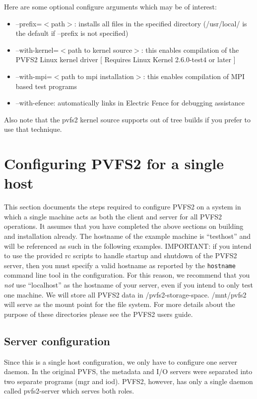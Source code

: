 \documentclass[11pt, letterpaper]{article}
\begin{document}
Here are some optional configure arguments which may be of interest:
\begin{itemize}
\item --prefix=$<$path$>$: installs all files in the specified directory
(/usr/local/ is the default if --prefix is not specified)
\item --with-kernel=$<$path to kernel source$>$: this enables compilation of
the PVFS2 Linux kernel driver [ Requires Linux Kernel 2.6.0-test4 or later ]
\item --with-mpi=$<$path to mpi installation$>$: this enables compilation of MPI
based test programs
\item --with-efence: automatically links in Electric Fence for debugging assistance
\end{itemize}

Also note that the pvfs2 kernel source supports out of tree builds if you 
prefer to use that technique.

\section{Configuring PVFS2 for a single host}
\label{sec:single}

This section documents the steps required to configure PVFS2 on a system
in which a single machine acts as both the client and server for all
PVFS2 operations.  It assumes that you have completed the above sections
on building and installation already.  The hostname of the example machine
is ``testhost'' and will be referenced as such in the following examples.
IMPORTANT: if you intend to use the provided rc scripts to handle startup
and shutdown of the PVFS2 server, then you must specify a valid hostname 
as reported by the \texttt{hostname} command line tool in the configuration.
For this reason, we recommend that you \emph{not} use ``localhost'' as 
the hostname of your server, even if you intend to only test one machine.
We will store all PVFS2 data in /pvfs2-storage-space.  /mnt/pvfs2 will
serve as the mount point for the file system.  For more details about
the purpose of these directories please see the PVFS2 users guide.

\subsection{Server configuration}

Since this is a single host configuration, we only have to configure one
server daemon.  In the original PVFS, the metadata and I/O servers were 
separated into two separate programs (mgr and iod).  PVFS2, however, has 
only a single daemon called pvfs2-server which serves both roles.
\end{document}
